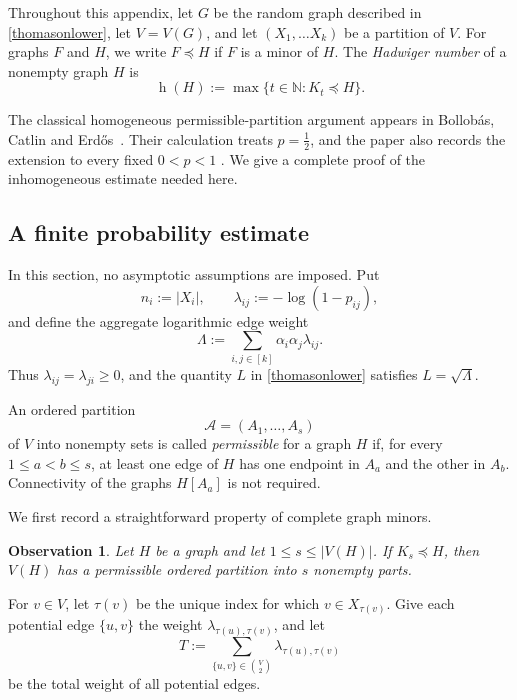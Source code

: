 \documentclass{article}
\newtheorem{obs}[thm]{Observation}
\newcommand{\N}{\mathbb N}
\DeclareMathOperator{\had}{h}
\begin{document}
Throughout this appendix, let $G$ be the random graph described in \cref{thomasonlower}, let $V = V(G)$, and let $(X_1, \ldots X_k)$ be a partition of $V$. For graphs \(F\) and \(H\), we write \(F\preccurlyeq H\) if \(F\) is a
minor of \(H\).  The \emph{Hadwiger number} of a nonempty graph \(H\) is
\[
  \had(H):=\max\{t\in\N:K_t\preccurlyeq H\}.
\]

The classical homogeneous permissible-partition argument appears in
Bollob\'as, Catlin and Erd\H{o}s~\cite{MR593989}.  Their calculation treats \(p=\tfrac12\), and the
paper also records the extension to every fixed \(0<p<1\)
\cite[p.~198]{MR593989}.  We give a complete proof of the inhomogeneous
estimate needed here.

\subsection{A finite probability estimate}

In
this section, no asymptotic assumptions are imposed.  Put
\[
  n_i:=|X_i|,\qquad
  \lambda_{ij}:=-\log(1-p_{ij}),
\]
and define the aggregate logarithmic edge weight
\begin{equation}\label{eq:def-Lambda}
  \Lambda
  :=\sum_{i,j\in[k]}\alpha_i\alpha_j\lambda_{ij}.
\end{equation}
Thus \(\lambda_{ij}=\lambda_{ji}\geq0\), and the quantity \(L\) in
\cref{thomasonlower} satisfies \(L=\sqrt{\Lambda}\).

An ordered partition
\[
  \mathcal A=(A_1,\dots,A_s)
\]
of \(V\) into nonempty sets is called \emph{permissible} for a graph
\(H\) if, for every \(1\leq a<b\leq s\), at least one edge of \(H\)
has one endpoint in \(A_a\) and the other in \(A_b\).  Connectivity of
the graphs \(H[A_a]\) is not required.

We first record a straightforward property of complete graph minors.

\begin{obs}
\label{obs:minor-partition}
Let \(H\) be a graph and let \(1\leq s\leq |V(H)|\).  If
\(K_s\preccurlyeq H\), then \(V(H)\) has a permissible ordered
partition into \(s\) nonempty parts.
\end{obs}

For \(v\in V\), let \(\tau(v)\) be the unique index for which
\(v\in X_{\tau(v)}\).  Give each potential edge \(\{u,v\}\) the
weight \(\lambda_{\tau(u),\tau(v)}\), and let
\[
  T:=\sum_{\{u,v\}\in\binom V2}
       \lambda_{\tau(u),\tau(v)}
\]
be the total weight of all potential edges.
\end{document}
